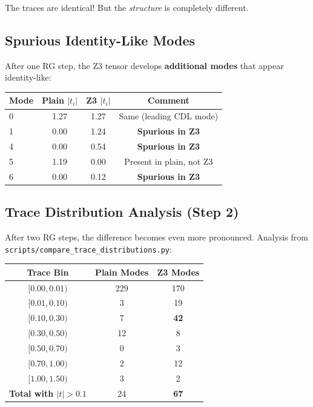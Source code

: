 \documentclass{article}
\begin{document}
The traces are identical! But the \textit{structure} is completely different.

\subsection{Spurious Identity-Like Modes}

After one RG step, the Z3 tensor develops \textbf{additional modes} that appear identity-like:

\begin{center}
\begin{tabular}{|l|c|c|c|}
\hline
\textbf{Mode} & \textbf{Plain $|t_i|$} & \textbf{Z3 $|t_i|$} & \textbf{Comment} \\
\hline
0 & 1.27 & 1.27 & Same (leading CDL mode) \\
1 & 0.00 & 1.24 & \textbf{Spurious in Z3} \\
4 & 0.00 & 0.54 & \textbf{Spurious in Z3} \\
5 & 1.19 & 0.00 & Present in plain, not Z3 \\
6 & 0.00 & 0.12 & \textbf{Spurious in Z3} \\
\hline
\end{tabular}
\end{center}

\subsection{Trace Distribution Analysis (Step 2)}

After two RG steps, the difference becomes even more pronounced. Analysis from \texttt{scripts/compare\_trace\_distributions.py}:

\begin{center}
\begin{tabular}{|c|c|c|}
\hline
\textbf{Trace Bin} & \textbf{Plain Modes} & \textbf{Z3 Modes} \\
\hline
$[0.00, 0.01)$ & 229 & 170 \\
$[0.01, 0.10)$ & 3 & 19 \\
$[0.10, 0.30)$ & 7 & \textbf{42} \\
$[0.30, 0.50)$ & 12 & 8 \\
$[0.50, 0.70)$ & 0 & 3 \\
$[0.70, 1.00)$ & 2 & 12 \\
$[1.00, 1.50)$ & 3 & 2 \\
\hline
\textbf{Total with $|t|>0.1$} & 24 & \textbf{67} \\
\hline
\end{tabular}
\end{center}
\end{document}
